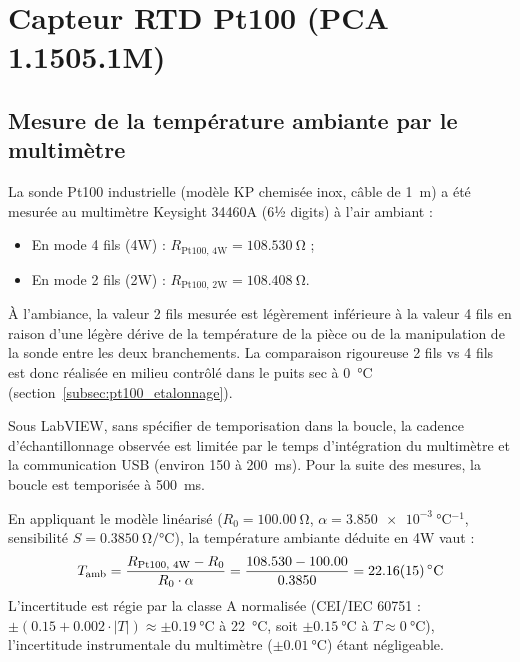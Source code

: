 \clearpage
\section{Capteur RTD Pt100 (PCA 1.1505.1M)}

\subsection{Mesure de la température ambiante par le multimètre}
\label{subsec:pt100_ambiante}

La sonde Pt100 industrielle (modèle KP chemisée inox, câble de \qty{1}{\meter}) a été mesurée au multimètre Keysight 34460A (6½ digits) à l'air ambiant :
\begin{itemize}[leftmargin=1.2cm,topsep=2pt,itemsep=1pt]
    \item En mode 4 fils (4W) : $R_{\text{Pt100, 4W}} = \qty{108.530}{\ohm}$ ;
    \item En mode 2 fils (2W) : $R_{\text{Pt100, 2W}} = \qty{108.408}{\ohm}$.
\end{itemize}
À l'ambiance, la valeur 2 fils mesurée est légèrement inférieure à la valeur 4 fils en raison d'une légère dérive de la température de la pièce ou de la manipulation de la sonde entre les deux branchements. La comparaison rigoureuse 2 fils vs 4 fils est donc réalisée en milieu contrôlé dans le puits sec à \qty{0}{\degreeCelsius} (section~\ref{subsec:pt100_etalonnage}).

Sous LabVIEW, sans spécifier de temporisation dans la boucle, la cadence d'échantillonnage observée est limitée par le temps d'intégration du multimètre et la communication USB (environ 150 à \qty{200}{\milli\second}). Pour la suite des mesures, la boucle est temporisée à \qty{500}{\milli\second}.

En appliquant le modèle linéarisé ($R_0 = \qty{100.00}{\ohm}$, $\alpha = \qty{3.850e-3}{\degreeCelsius^{-1}}$, sensibilité $S = \qty{0.3850}{\ohm\per\degreeCelsius}$), la température ambiante déduite en 4W vaut :
\begin{equation}
    T_{\text{amb}} = \frac{R_{\text{Pt100, 4W}} - R_0}{R_0 \cdot \alpha} = \frac{108.530 - 100.00}{0.3850} = \mathbf{\qty{22.16 \pm 0.15}{\degreeCelsius}}
\end{equation}
L'incertitude est régie par la classe A normalisée (CEI/IEC 60751 : $\pm (0.15 + 0.002 \cdot |T|) \approx \pm \qty{0.19}{\degreeCelsius}$ à \qty{22}{\degreeCelsius}, soit $\pm \qty{0.15}{\degreeCelsius}$ à $T \approx \qty{0}{\degreeCelsius}$), l'incertitude instrumentale du multimètre ($\pm \qty{0.01}{\degreeCelsius}$) étant négligeable.

